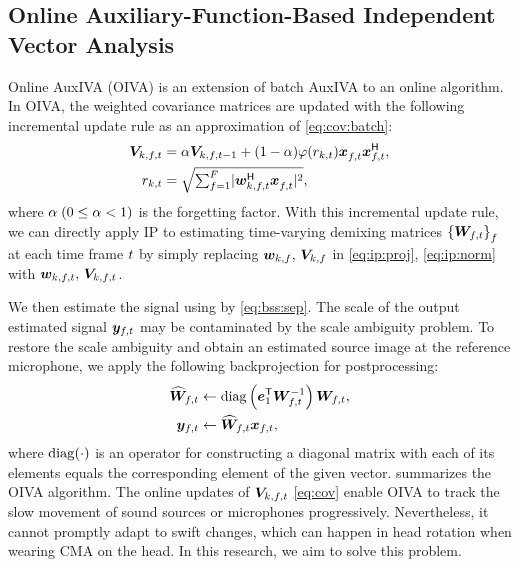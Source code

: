 \documentclass[sip,biber]{now-journal}
\begin{document}
\subsection{Online Auxiliary-Function-Based Independent Vector Analysis}\label{subsec:oiva}

Online AuxIVA (OIVA) \cite{Taniguchi:2014:HSCMA} is an extension of batch AuxIVA to an online algorithm.
In OIVA, the weighted covariance matrices are updated with the following incremental update rule as an approximation of \eqref{eq:cov:batch}:
\begin{align}
  \cov _{\src,\ft} &= \forget \cov _{\src,\ft[-1]} + (1 - \forget) \weight(\var _{\src,\tframe}) \Obs _{\ft} ^{\nohermite} \Obs _{\ft} ^{\hermite}, \label{eq:cov} \\
  \var _{\src,\tframe} &= \textstyle\sqrt{\sum _{\freq=1} ^{\Freq} \lvert \demix ^{\hermite} _{\src,\ft} \Obs ^{\nohermite}_{\ft} \rvert ^2} \label{eq:var},
\end{align}
where $\alpha\; (0 \leq \alpha < 1)$ is the forgetting factor.
With this incremental update rule, we can directly apply IP to estimating time-varying demixing matrices ${\{\Demix _{\ft}\}} _{\freq}$ at each time frame $t$ by simply replacing $\bm{w} _{k,f},\, \bm{V} _{k,f}$ in \eqref{eq:ip:proj}, \eqref{eq:ip:norm} with $\demix _{\src,\ft},\, \cov _{\src,\ft}$.

We then estimate the signal using by \eqref{eq:bss:sep}.
The scale of the output estimated signal $\Est _{\ft}$ may be contaminated by the scale ambiguity problem.
To restore the scale ambiguity and obtain an estimated source image at the reference microphone,
we apply the following backprojection \cite{Murata:2001:NC} for postprocessing:
\begin{align}
  \proj{\Demix} _{\ft}
    &\gets
    \diag\left(\eye _{1} ^{\top} \Demix _{\ft} ^{-1} \right) \Demix _{\ft},
    \label{eq:pb:w}
    \\
  \Est _{\ft}
    &\gets
    \proj{\Demix }_{\ft} \Obs _{\ft},
    \label{eq:pb:y}
\end{align}
where $\operatorname{diag}(\cdot)$ is an operator for constructing a diagonal matrix with each of its elements equals the corresponding element of the given vector.
 summarizes the OIVA algorithm.
The online updates of $\cov _{\src,\ft}$ \eqref{eq:cov} enable OIVA to track the slow movement of sound sources or microphones progressively.
Nevertheless, it cannot promptly adapt to swift changes, which can happen in head rotation when wearing CMA on the head.
In this research, we aim to solve this problem.
\end{document}
